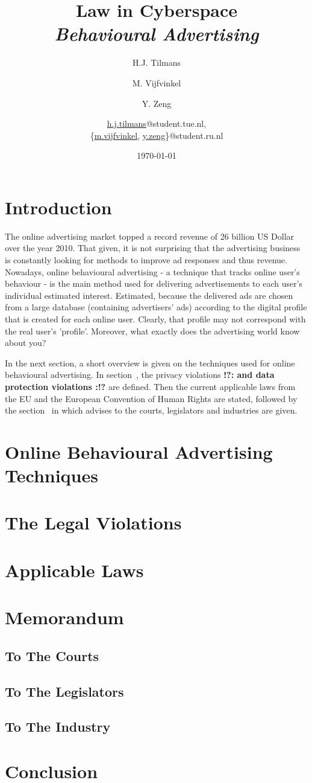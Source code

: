 \documentclass[11pt]{article}
\title{\textbf{Law in Cyberspace\\ \emph{Behavioural Advertising}}}
\author{
	H.J. Tilmans
	\and M. Vijfvinkel
	\and Y. Zeng
	\and
	\href{mailto:h.j.tilmans@student.tue.nl}{h.j.tilmans}@student.tue.nl,\\
	\{\href{mailto:m.vijfvinkel@student.ru.nl}{m.vijfvinkel},
	\href{mailto:y.zeg@student.ru.nl}{y.zeng}\}@student.ru.nl
}
\date{\today}
\newcommand{\tocheck}[1]{{\bf !?: #1 :!?}}
\begin{document}
\maketitle
\section{Introduction}
The online advertising market topped a record revenue of 26 billion US Dollar over the year 2010. \cite{IAB2011}
That given, it is not surprising that the advertising business is constantly looking for methods to improve ad responses and thus revenue.
Nowadays, online behavioural advertising - a technique that tracks online user's behaviour - is the main method used for delivering advertisements to each user's individual estimated interest. Estimated, because the delivered ads are chosen from a large database (containing advertisers' ads) according to the digital profile that is created for each online user. Clearly, that profile may not correspond with the real user's 'profile'.
Moreover, what exactly does the advertising world know about you?

In the next section, a short overview is given on the techniques used for online behavioural advertising. In section~, the privacy violations \tocheck{and data protection violations} are defined. Then the current applicable laws from the EU and the European Convention of Human Rights are stated, followed by the section~ in which advises to the courts, legislators and industries are given.
\section{Online Behavioural Advertising Techniques}
\label{techniques}

\section{The Legal Violations}
\label{legal violations}

\section{Applicable Laws}
\label{applicable laws}

\section{Memorandum}
\label{memorandum}
\subsection{To The Courts}
\subsection{To The Legislators}
\subsection{To The Industry}

\section{Conclusion}



\end{document}
